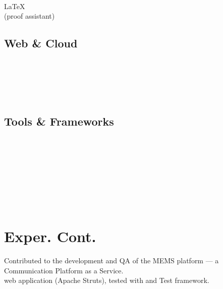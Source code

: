 \documentclass[a4paper]{oscar-resume}
\begin{document}
\begin{minipage}[t]{0.33\textwidth}
        \java{} \textbullet{} \kotlin{} \\
        \haskell{} \\
        \vhdl{} \textbullet{} \verilog{} \\
        \LaTeX{} \textbullet{} \matlab{} \\
        \isabelle{} (proof assistant) \\
    \sectionspace{}

    \subsection{Web \& Cloud}
    \smallsectionspace{}
        \xml{} \textbullet{} \json{} \\
        \css{} \textbullet{} \react{} \\
        \aws{} \boto{} \textbullet{} \ectwo{} \textbullet{} \rds{} \\
        \jnciaJunos{} \textbullet{} \jnciaDevOps{} \\
    \sectionspace{}

    \subsection{Tools \& Frameworks}
    \smallsectionspace{}
        \linux{} \textbullet{} \git{} \textbullet{} \docker{} \\
        \cmake{} \textbullet{} \conan{} \textbullet{} \gdb{} \\
        \pytest{} \textbullet{} \asyncio{} \\
        \nodejs{} \textbullet{} \spring{} \\
        \googletest{} \textbullet{} \junit{} \\
        \cucumber{} \\
        \ansible{} \textbullet{} \jenkins{} \\

    \section{Exper. Cont.}
    \smallsectionspace{}

        \vspace{\topsep}
        \textbullet{} Contributed to the development and QA of the MEMS platform --- a Communication Platform as a Service. \\
        \textbullet{} \java{} web application (Apache Struts), tested with \junit{} and \cucumber{} Test framework. \\
    \smallsectionspace{}

\end{minipage} %
\end{document}
